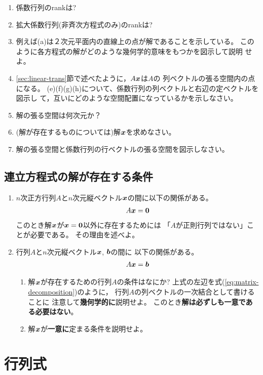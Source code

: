 \documentclass[twocolumn,11pt]{jarticle}
\begin{document}
\begin{enumerate}
\item 係数行列のrankは?
\item 拡大係数行列(非斉次方程式のみ)のrankは?
\item 例えば(a)は２次元平面内の直線上の点が解であることを示している。
  このように各方程式の解がどのような幾何学的意味をもつかを図示して説明
  せよ。
\item \ref{sec:linear-trans}節で述べたように，$A\boldsymbol{x}$は$A$の
  列ベクトルの張る空間内の点になる。
  (e)(f)(g)(h)について、係数行列の列ベクトルと右辺の定ベクトルを図示し
  て，互いにどのような空間配置になっているかを示しなさい。
\item 解の張る空間は何次元か？
\item (解が存在するものについては)解$\boldsymbol{x}$を求めなさい。
\item 解の張る空間と係数行列の行ベクトルの張る空間を図示しなさい。
\end{enumerate}%

\subsection{連立方程式の解が存在する条件}
\begin{enumerate}
\item 
$n$次正方行列$A$と$n$次元縦ベクトル$\boldsymbol{x}$の間に以下の関係がある。
\begin{align}
  A\boldsymbol{x}=\boldsymbol{0} \notag
\end{align}
このとき解$\boldsymbol{x}$が$\boldsymbol{x}=\boldsymbol{0}$以外に存在するためには
「$A$が正則行列ではない」ことが必要である。
その理由を述べよ。
\item 行列$A$と$n$次元縦ベクトル$\boldsymbol{x}$, $\boldsymbol{b}$の間に
  以下の関係がある。
  \begin{align}
  A\boldsymbol{x}=\boldsymbol{b} \notag
  \end{align}
  \begin{enumerate}
  \item 解$\boldsymbol{x}$が存在するための行列$A$の条件はなにか?
    上式の左辺を式(\ref{eq:matrix-decomposition})のように，
    行列$A$の列ベクトルの一次結合として書けることに
    注意して\textbf{幾何学的に}説明せよ。
    このとき\textbf{解は必ずしも一意である必要はない}。
  \item 解$\boldsymbol{x}$が\textbf{一意に}定まる条件を説明せよ。
  \end{enumerate}
\end{enumerate}%

\section{行列式}
\end{document}
